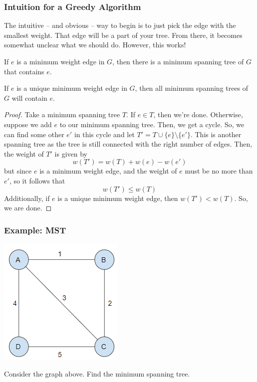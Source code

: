 \documentclass[letterpaper]{article}
\begin{document}
\subsubsection{Intuition for a Greedy Algorithm}
The intuitive -- and obvious -- way to begin is to just pick the edge with the smallest weight. That edge will be a part of your tree. From there, it becomes somewhat unclear what we should do. However, this works! 

\begin{lemma}{}{}
    If $e$ is a minimum weight edge in $G$, then there is a minimum spanning tree of $G$ that contains $e$. 

    \bigskip 

    If $e$ is a unique minimum weight edge in $G$, then all minimum spanning trees of $G$ will contain $e$. 
\end{lemma}

\begin{mdframed}[]
    \begin{proof}
        Take a minimum spanning tree $T$. If $e \in T$, then we're done. Otherwise, suppose we add $e$ to our minimum spanning tree. Then, we get a cycle. So, we can find some other $e'$ in this cycle and let $T' = T \cup \{e\} \setminus \{e'\}$. This is another spanning tree as the tree is still connected with the right number of edges. Then, the weight of $T'$ is given by 
        \[w(T') = w(T) + w(e) - w(e')\]
        but since $e$ is a minimum weight edge, and the weight of $e$ must be no more than $e'$, so it follows that 
        \[w(T') \leq w(T)\] 
        Additionally, if $e$ is a unique minimum weight edge, then $w(T') < w(T)$. So, we are done. 
    \end{proof}
\end{mdframed}

\subsubsection{Example: MST}
\begin{center}
    \includegraphics[scale=0.6]{../assets/mst_1.png}
\end{center}
Consider the graph above. Find the minimum spanning tree. 
\end{document}
